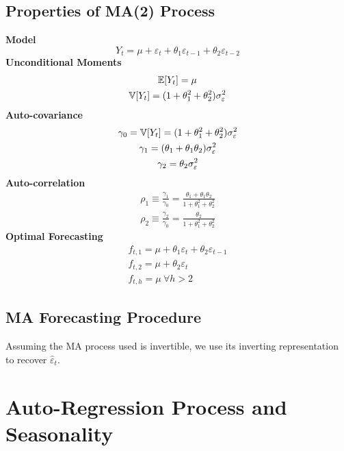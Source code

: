 \documentclass[11pt]{article}
\begin{document}
		\subsection{Properties of MA(2) Process}
			\textbf{Model}
				\begin{equation}
					Y_t = \mu + \varepsilon_t + \theta_1 \varepsilon_{t-1} + \theta_2 \varepsilon_{t-2}
				\end{equation}
			\textbf{Unconditional Moments}
				\begin{gather}
					\mathbb{E}[{Y_t}] = \mu \\
					\mathbb{V}[{Y_t}] = (1 + \theta_1^2 + \theta_2^2) \sigma_\varepsilon^2
				\end{gather}
			\textbf{Auto-covariance}
				\begin{gather}
					\gamma_0 = \mathbb{V}[{Y_t}] = (1 + \theta_1^2 + \theta_2^2) \sigma_\varepsilon^2 \\
					\gamma_1 = (\theta_1 + \theta_1 \theta_2) \sigma_\varepsilon^2 \\
					\gamma_2 = \theta_2 \sigma_\varepsilon^2
				\end{gather}
			\textbf{Auto-correlation}
				\begin{gather}
					\rho_1 \equiv \frac{\gamma_1}{\gamma_0} = \frac{\theta_1 + \theta_1 \theta_2}{1 + \theta_1^2 + \theta_2^2} \\
					\rho_2 \equiv \frac{\gamma_2}{\gamma_0} = \frac{\theta_2}{1 + \theta_1^2 + \theta_2^2}
				\end{gather}
			\textbf{Optimal Forecasting}
				\begin{gather}
					f_{t, 1} = \mu + \theta_1 \varepsilon_t + \theta_2 \varepsilon_{t-1} \\
					f_{t, 2} = \mu + \theta_2 \varepsilon_t \\
					f_{t, h} = \mu\ \forall h > 2
				\end{gather}
			
		\subsection{MA Forecasting Procedure}
			\begin{remark}
				Assuming the MA process used is invertible, we use its inverting representation to recover $\hat{\varepsilon}_t$.
			\end{remark}
	
	\section{Auto-Regression Process and Seasonality}
\end{document}
